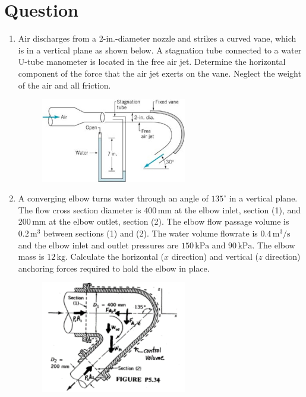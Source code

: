 \documentclass[12pt,a4paper]{article}
\newcounter{question}
\newenvironment{questions}{
    \setcounter{question}{0}
    \section*{Question}
    \begin{enumerate}[leftmargin=1.5em,label={\arabic*．}]
}{
    \end{enumerate}
}
\begin{document}
\begin{questions}
\item Air discharges from a 2-in.-diameter nozzle and strikes a curved vane, which is in a vertical plane as shown below. A stagnation tube connected to a water U-tube manometer is located in the free air jet. Determine the horizontal component of the force that the air jet exerts on the vane. Neglect the weight of the air and all friction.
\begin{figure}[H]
  \centering
  \includegraphics[width=0.6\textwidth]{./figures/12.png}
\end{figure}

\item A converging elbow turns water through an angle of $135^\circ$ in a vertical plane. The flow cross section diameter is $400\,\mathrm{mm}$ at the elbow inlet, section (1), and $200\,\mathrm{mm}$ at the elbow outlet, section (2). The elbow flow passage volume is $0.2\,\mathrm{m}^3$ between sections (1) and (2). The water volume flowrate is $0.4\,\mathrm{m}^3/\mathrm{s}$ and the elbow inlet and outlet pressures are $150\,\mathrm{kPa}$ and $90\,\mathrm{kPa}$. The elbow mass is $12\,\mathrm{kg}$. Calculate the horizontal ($x$ direction) and vertical ($z$ direction) anchoring forces required to hold the elbow in place.

\begin{figure}[H]
\centering
\includegraphics[width=0.6\textwidth]{./figures/19.png}
\end{figure}


\end{questions}
\end{document}
